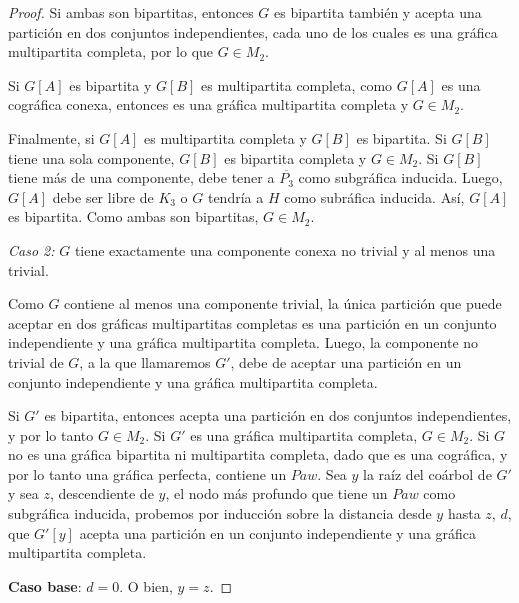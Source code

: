 \begin{proof}
    Si ambas son bipartitas, entonces $G$ es bipartita también y acepta una partición en dos conjuntos independientes, cada uno de los cuales es una gráfica multipartita completa, por lo que $G \in M_2$.

    Si $G[A]$ es bipartita y $G[B]$ es multipartita completa, como $G[A]$ es una cográfica conexa, entonces es una gráfica multipartita completa y $G \in M_2$.

    Finalmente, si $G[A]$ es multipartita completa y $G[B]$ es bipartita. Si $G[B]$ tiene una sola componente, $G[B]$ es bipartita completa y $G \in M_2$. Si $G[B]$ tiene más de una componente, debe tener a $\overline{P_3}$ como subgráfica inducida. Luego, $G[A]$ debe ser libre de $K_3$ o $G$ tendría a $H$ como subráfica inducida. Así, $G[A]$ es bipartita. Como ambas son bipartitas, $G \in M_2$.

    \emph{Caso 2:} $G$ tiene exactamente una componente conexa no trivial y al menos una trivial.

    Como $G$ contiene al menos una componente trivial, la única partición que puede aceptar en dos gráficas multipartitas completas es una partición en un conjunto independiente y una gráfica multipartita completa. Luego, la componente no trivial de $G$, a la que llamaremos $G'$, debe de aceptar una partición en un conjunto independiente y una gráfica multipartita completa.

    Si $G'$ es bipartita, entonces acepta una partición en dos conjuntos independientes, y por lo tanto $G \in M_2$. Si $G'$ es una gráfica multipartita completa, $G \in M_2$. Si $G$ no es una gráfica bipartita ni multipartita completa, dado que es una cográfica, y por lo tanto una gráfica perfecta, contiene un $Paw$. Sea $y$ la raíz del coárbol de $G'$ y sea $z$, descendiente de $y$, el nodo más profundo que tiene un $Paw$ como subgráfica inducida, probemos por inducción sobre la distancia desde $y$ hasta $z$, $d$, que $G'[y]$ acepta una partición en un conjunto independiente y una gráfica multipartita completa.

    \textbf{Caso base}: $d = 0$. O bien, $y = z$.


\end{proof}
